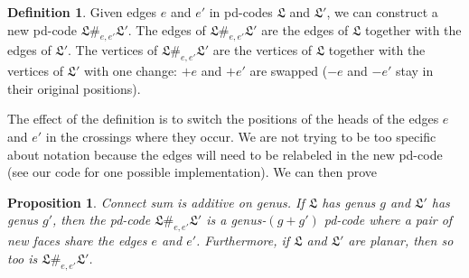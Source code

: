 \documentclass[amsmath,secnumarabic,floatfix,amssymb,nofootinbib,nobibnotes,letterpaper,11pt,tightenlines,showkeys]{revtex4}
\newtheorem{proposition}[theorem]{Proposition}
\theoremstyle{definition}
\newtheorem{definition}[theorem]{Definition}
\begin{document}
\begin{definition}
Given edges $e$ and $e'$ in pd-codes $\mathfrak{L}$ and $\mathfrak{L}'$, we can construct a new pd-code $\mathfrak{L} \#_{e,e'} \mathfrak{L'}$. The edges of $\mathfrak{L} \#_{e,e'} \mathfrak{L'}$ are the edges of $\mathfrak{L}$ together with the edges of $\mathfrak{L'}$. The vertices of $\mathfrak{L} \#_{e,e'} \mathfrak{L'}$ are the vertices of $\mathfrak{L}$ together with the vertices of $\mathfrak{L'}$ with one change: $+e$ and $+e'$ are swapped ($-e$ and $-e'$ stay in their original positions).
\end{definition}
The effect of the definition is to switch the positions of the heads of the edges $e$ and $e'$ in the crossings where they occur. We are not trying to be too specific about notation because the edges will need to be relabeled in the new pd-code (see our code for one possible implementation).
We can then prove
\begin{proposition}
Connect sum is additive on genus. If $\mathfrak{L}$ has genus $g$ and $\mathfrak{L'}$ has genus $g'$, then the pd-code $\mathfrak{L} \#_{e,e'} \mathfrak{L'}$ is a genus-$(g+g')$ pd-code where a pair of new faces share the edges $e$ and $e'$. Furthermore, if $\mathfrak{L}$ and $\mathfrak{L'}$ are planar, then so too is $\mathfrak{L} \#_{e,e'} \mathfrak{L'}$.
\end{proposition}
\end{document}
